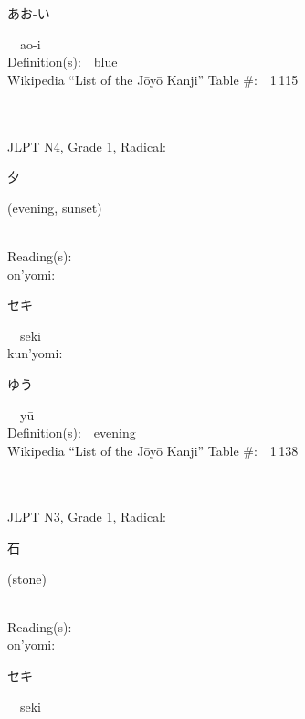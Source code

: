 \begin{multicols}{2}
{\hspace*{2em}}{\begin{CJK}{UTF8}{min} あお-い \end{CJK}}\ \ ao-i\ \ \\
Definition(s):\ \ blue \\
Wikipedia ``List of the J\=oy\=o Kanji'' Table \#:\ \ 1\,115 \\
\ \ \\
{\fontsize{34pt}{40pt}  }\ \ \\  %
{JLPT N4, Grade 1, Radical:\ \ {\begin{CJK}{UTF8}{min} 夕 \end{CJK}} (evening, sunset) } \\
Reading(s):\ \ \\
{\hspace*{1em}}on'yomi:\ \ \\
{\hspace*{2em}}{\begin{CJK}{UTF8}{min} セキ \end{CJK}}\ \ seki\ \ \\
{\hspace*{1em}}kun'yomi:\ \ \\
{\hspace*{2em}}{\begin{CJK}{UTF8}{min} ゆう \end{CJK}}\ \ y\=u\ \ \\
Definition(s):\ \ evening \\
Wikipedia ``List of the J\=oy\=o Kanji'' Table \#:\ \ 1\,138 \\
\ \ \\
{\fontsize{34pt}{40pt}  }\ \ \\  %
{JLPT N3, Grade 1, Radical:\ \ {\begin{CJK}{UTF8}{min} 石 \end{CJK}} (stone) } \\
Reading(s):\ \ \\
{\hspace*{1em}}on'yomi:\ \ \\
{\hspace*{2em}}{\begin{CJK}{UTF8}{min} セキ \end{CJK}}\ \ seki\ \ \\

\end{multicols}
